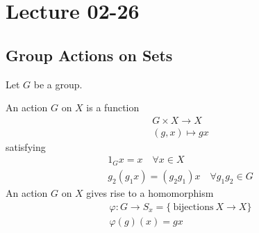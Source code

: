 \documentclass[class=scrartcl, crop=false]{standalone}
\date{2020-02-26}
\begin{document}
\section{Lecture 02-26}

\subsection{Group Actions on Sets}

Let $G$ be a group. 

\begin{definition}
  An action $G$ on $X$ is a function 
  \begin{gather*}
    G \times X \to X  \\
    (g, x) \mapsto gx
  \end{gather*} 
  satisfying 
  \begin{gather*}
    1_G x = x \quad \forall x \in X \\
    g_2(g_1x) = (g_2g_1)x \quad \forall g_1g_2 \in G
  \end{gather*} 
  An action $G$ on $X$ gives rise to a homomorphism 
  \begin{gather*}
    \varphi: G \to S_x = \{ \ \text{bijections} \ X \to X\} \\
    \varphi(g)(x) = gx
  \end{gather*} 
\end{definition} 
\end{document}
